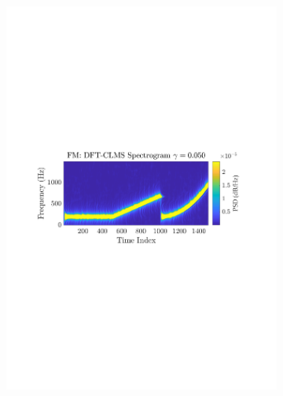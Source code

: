 \documentclass[12pt]{article}
\numberwithin{equation}{section}
\begin{document}
\begin{figure}[H]
\begin{subfigure}{0.49\textwidth}
					\includegraphics[trim={2.2cm 11.2cm 3.00cm  11.2cm}, clip, width=\textwidth]{../MATLAB/figures/q3_3c_fig03.pdf} 
					\captionsetup{justification=centering}
				\end{subfigure}
			

\end{figure}
\end{document}
